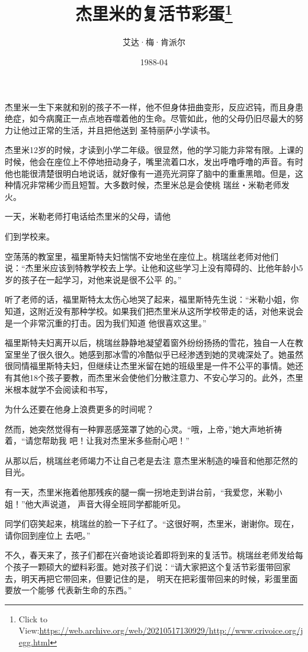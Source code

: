 \documentclass{article}
\title{杰里米的复活节彩蛋\footnote{Click to View:\url{https://web.archive.org/web/20210517130929/http://www.crivoice.org/jegg.html}}}
\author{艾达·梅·肯派尔}
\date{1988-04}
\begin{document}

\maketitle


\Large

﻿杰里米一生下来就和别的孩子不一样，他不但身体扭曲变形，反应迟钝，而且身患绝症，如今病魔正一点点地吞噬着他的生命。尽管如此，他的父母仍旧尽最大的努力让他过正常的生活，并且把他送到
圣特丽萨小学读书。  

杰里米12岁的时候，才读到小学二年级。很显然，他的学习能力非常有限。上课的时候，他会在座位上不停地扭动身子，嘴里流着口水，发出呼噜呼噜的声音。有时他也能很清楚很明白地说话，就好像有一道亮光洞穿了脑中的重重黑暗。但是，这种情况非常稀少而且短暂。大多数时候，杰里米总是会使桃
瑞丝・米勒老师发火。  

一天，米勒老师打电话给杰里米的父母，请他
\newpage

们到学校来。  

空荡荡的教室里，福里斯特夫妇惴惴不安地坐在座位上。桃瑞丝老师对他们说：“杰里米应该到特教学校去上学。让他和这些学习上没有障碍的、比他年龄小5岁的孩子在一起学习，对他来说是很不公平
的。”  

听了老师的话，福里斯特太太伤心地哭了起来，福里斯特先生说：“米勒小姐，你知道，这附近没有那种学校。如果我们把杰里米从这所学校带走的话，对他来说会是一个非常沉重的打击。因为我们知道
他很喜欢这里。”  

福里斯特夫妇离开以后，桃瑞丝静静地凝望着窗外纷纷扬扬的雪花，独自一人在教室里坐了很久很久。她感到那冰雪的冷酷似乎已经渗透到她的灵魂深处了。她虽然很同情福里斯特夫妇，但继续让杰里米留在她的班级里是一件不公平的事情。她还有其他18个孩子要教，而杰里米会使他们分散注意力、不安心学习的。此外，杰里米根本就学不会阅读和书写，
\newpage

为什么还要在他身上浪费更多的时间呢？  

然而，她突然觉得有一种罪恶感笼罩了她的心灵。“哦，上帝，”她大声地祈祷着，“请您帮助我
吧！让我对杰里米多些耐心吧！”  

从那以后，桃瑞丝老师竭力不让自己老是去注
意杰里米制造的噪音和他那茫然的目光。  

有一天，杰里米拖着他那残疾的腿一瘸一拐地走到讲台前，“我爱您，米勒小姐！”他大声说道，
声音大得全班同学都能听见。  

同学们窃笑起来，桃瑞丝的脸一下子红了。“这很好啊，杰里米，谢谢你。现在，请你回到座位上
去吧。”  

不久，春天来了，孩子们都在兴奋地谈论着即将到来的复活节。桃瑞丝老师发给每个孩子一颗硕大的塑料彩蛋。她对孩子们说：“请大家把这个复活节彩蛋带回家去，明天再把它带回来，但要记住的是，
\newpage
明天在把彩蛋带回来的时候，彩蛋里面要放一个能够
代表新生命的东西。”  
\end{document}
